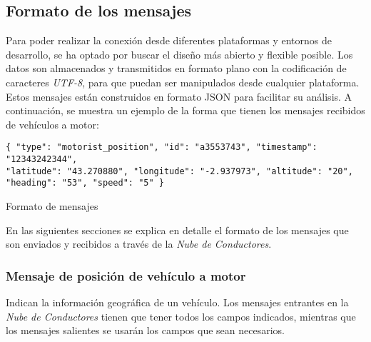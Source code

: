 \subsection{Formato de los mensajes}\label{ssection:FormatoMensajesNC}
Para poder realizar la conexión desde diferentes plataformas y entornos de desarrollo,
se ha optado por buscar el diseño más abierto y flexible posible. Los datos son almacenados
y transmitidos en formato plano con la codificación de caracteres \emph{UTF-8}, para
que puedan ser manipulados desde cualquier plataforma. Estos mensajes están construidos
en formato \gls{JSON} para facilitar su análisis. A continuación, se muestra un
ejemplo de la forma que tienen los mensajes recibidos de vehículos a motor:

\begin{listing}
	\begin{minipage}{.4\textwidth}
		\begin{verbatim}
{ "type": "motorist_position", "id": "a3553743", "timestamp": "12343242344",
"latitude": "43.270880", "longitude": "-2.937973", "altitude": "20",
"heading": "53", "speed": "5" }
		\end{verbatim}
	\end{minipage}
	\caption{Formato de mensajes}\label{alg:formatoMensajes}
\end{listing}

En las siguientes secciones se explica en detalle el formato de los mensajes que
son enviados y recibidos a través de la \emph{Nube de Conductores}.

\subsubsection{Mensaje de posición de vehículo a motor}\label{sssection:MensajePosVehMotor}
Indican la información geográfica de un vehículo. Los mensajes entrantes en la
\emph{Nube de Conductores} tienen que tener todos los campos indicados, mientras
que los mensajes salientes se usarán los campos que sean necesarios.


